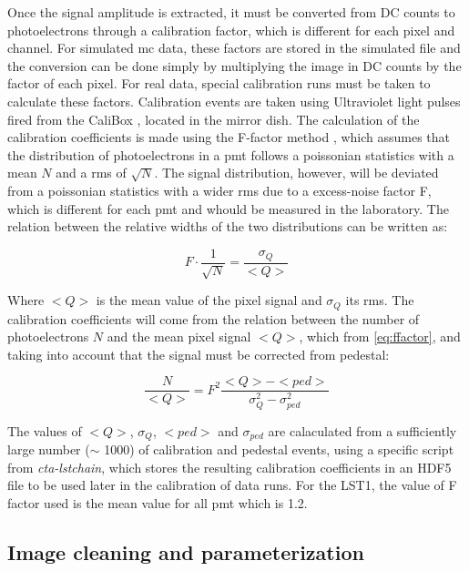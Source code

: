 \documentclass[main.tex]{subfiles}
\begin{document}
Once the signal amplitude is extracted, it must be converted from DC counts to photoelectrons through a calibration factor, which is different for each pixel and channel. For simulated \gls{mc} data, these factors are stored in the simulated file and the conversion can be done simply by multiplying the image in DC counts by the factor of each pixel. For real data, special calibration runs must be taken to calculate these factors. Calibration events are taken using Ultraviolet light pulses fired from the CaliBox \cite{2015CaliBox}, \cite{2019CaliBox} located in the mirror dish. The calculation of the calibration coefficients is made using the F-factor method \cite{1997calibrationPMT}, which assumes that the distribution of photoelectrons in a \gls{pmt} follows a poissonian statistics with a mean $N$ and a \gls{rms} of $\sqrt{N}$. The signal distribution, however, will be deviated from a poissonian statistics with a wider \gls{rms} due to a excess-noise factor F, which is different for each \gls{pmt} and whould be measured in the laboratory. The relation between the relative widths of the two distributions can be written as:

\begin{equation}
  F \cdot \frac{1}{\sqrt{N}} = \frac{\sigma_{Q}}{<Q>}
  \label{eq:ffactor}
\end{equation} 

Where $<Q>$ is the mean value of the pixel signal and $\sigma_{Q}$ its \gls{rms}. The calibration coefficients will come from the relation between the number of photoelectrons $N$ and the mean pixel signal $<Q>$, which from \ref{eq:ffactor}, and taking into account that the signal must be corrected from pedestal:

\begin{equation}
  \frac{N}{<Q>} = F^{2}\frac{<Q> - <ped>}{\sigma_{Q}^{2} - \sigma_{ped}^{2}}
\end{equation}

The values of $<Q>$, $\sigma_{Q}$, $<ped>$ and $\sigma_{ped}$ are calaculated from a sufficiently large number ($\sim$ 1000) of calibration and pedestal events, using a specific script from \textit{cta-lstchain}, which stores the resulting calibration coefficients in an HDF5 file to be used later in the calibration of data runs. For the LST1, the value of F factor used is the mean value for all \gls{pmt} which is 1.2.

\subsection{Image cleaning and parameterization} \label{sec:cleanpars}
\end{document}

